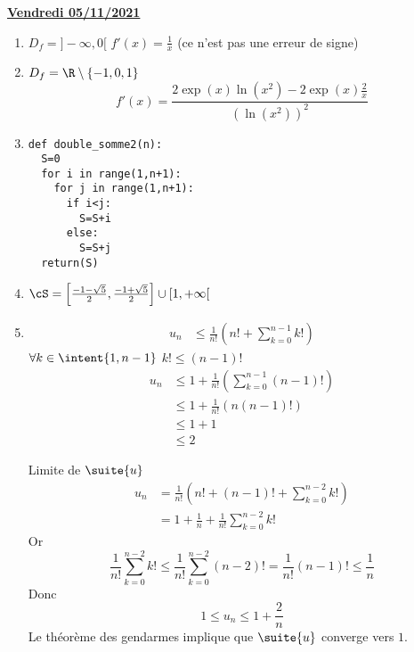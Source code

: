 \documentclass[a4paper, 11pt,reqno]{article}
\newcommand{\jour}[1]{
\begin{center}
\underline{\textbf{#1}}
\end{center}

 }
\begin{document}
\jour{Vendredi 05/11/2021}
\begin{correction}
\begin{enumerate}
\item $D_f =]-\infty, 0[$
$f'(x) =\frac{1}{x}$ (ce n'est pas une erreur de signe) 
\item 
$D_f = \R\setminus\{ -1,0,1\} $
$$f'(x) = \frac{2\exp(x)\ln(x^2)- 2\exp(x) \frac{2}{x}}{(\ln(x^2))^2}$$

\item 
\begin{lstlisting}
def double_somme2(n):
  S=0
  for i in range(1,n+1):
    for j in range(1,n+1):
      if i<j:
        S=S+i
      else:
        S=S+j
  return(S)
\end{lstlisting}


\item $\cS = \left[\frac{-1-\sqrt{5}}{2}, \frac{-1+\sqrt{5}}{2} \right]\cup [1,+\infty[$
\item 
\begin{align*}
u_n &\leq \frac{1}{n! } (n! +\sum_{k=0}^{n-1} k!)
\end{align*}
$\forall k\in \intent{1,n-1}$ $k! \leq (n-1)!$
\begin{align*}
u_n  & \leq 1+\frac{1}{n! } (\sum_{k=0}^{n-1} (n-1)!)\\
 & \leq 1+\frac{1}{n! } (n (n-1)!)\\
  & \leq 1+1\\
    & \leq 2
\end{align*}


Limite de $\suite{u}$
\begin{align*}
u_n &= \frac{1}{n!} \left( n! +(n-1)! +\sum_{k=0}^{n-2} k! \right)\\
		&= 1  +\frac{1}{n}+\frac{1}{n!}\sum_{k=0}^{n-2} k! 
\end{align*}
Or 
$$\frac{1}{n!}\sum_{k=0}^{n-2} k ! \leq \frac{1}{n!}\sum_{k=0}^{n-2} (n-2)!=\frac{1}{n!}  (n-1)! \leq \frac{1}{n}$$
Donc
$$1\leq u_n \leq 1  +\frac{2}{n}$$
Le théorème des gendarmes implique que $\suite{u}$ converge vers $1$. 





	 
\end{enumerate}
\end{correction} 
\end{document}

